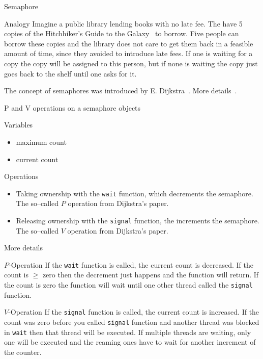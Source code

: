 \documentclass[\classoption]{beamer}
\begin{document}
\begin{frame}{Semaphore}

\begin{block}{Analogy}
Imagine a public library lending books with no late fee. The have 5 copies of the Hitchhiker's Guide to the Galaxy~\cite{adams2017hitchhiker} to borrow. Five people can borrow these copies and the library does not care to get them back in a feasible amount of time, since they avoided to introduce late fees. If one is waiting for a copy the copy will be assigned to this person, but if none is waiting the copy just goes back to the shelf until one asks for it. 
\end{block}
\vspace{0.5cm}
The concept of semaphores was introduced by E. Dijkstra~\cite{dijkstra1962over}. More details~\cite{downey2008little}.
\end{frame}

\begin{frame}{P and V operations on a semaphore objects}

\begin{block}{Variables}
\begin{itemize}
\item maximum count
\item current count
\end{itemize}
\end{block}

\begin{block}{Operations}
\begin{itemize}
\item Taking ownership with the \lstinline|wait| function, which decrements the semaphore. The so--called $P$ operation from Dijkstra's paper.
\item Releasing ownership with the \lstinline|signal| function, the increments the semaphore. The so--called $V$ operation from Dijkstra's paper.
\end{itemize}
\end{block}

\end{frame}

\begin{frame}{More details}

\begin{block}{$P$-Operation}
If the \lstinline|wait| function is called, the current count is decreased. If the count is $\geq$ zero then the decrement just happens and the function will return. If the count is zero the function will wait until one other thread called the  \lstinline|signal| function.
\end{block}

\begin{block}{$V$-Operation}
If the \lstinline|signal| function is called, the current count is increased. If the count was zero before you called \lstinline|signal| function and another thread was blocked in \lstinline|wait| then that thread will be executed. If multiple threads are waiting, only one will be executed and the reaming ones have to wait for another increment of the counter.
\end{block}

\end{frame}
\end{document}
